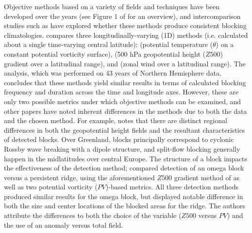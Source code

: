 \documentclass[smallextended]{svjour3}       %
\numberwithin{equation}{section}
\begin{document}
Objective methods based on a variety of fields and techniques have been developed over the years (see Figure 1 of \cite{barriopedro_application_2010} for an overview), and intercomparison studies such as \cite{barnes_methodology_2012} have explored whether these methods produce consistent blocking climatologies. \cite{barnes_methodology_2012} compares three longitudinally-varying (1D) methods (i.e. calculated about a single time-varying central latitude): \citealt{pelly_new_2003} (potential temperature ($\theta$) on a constant potential vorticity surface), \citealt{tibaldi_operational_1990} (500 hPa geopotential height ($Z500$) gradient over a latitudinal range), and \citealt{scaife_atmospheric_2010} (zonal wind over a latitudinal range).
The analysis, which was performed on 43 years of Northern Hemisphere data, concludes that these methods yield similar results in terms of calculated blocking frequency and duration across the time and longitude axes. However, these are only two possible metrics under which objective methods can be examined, and other papers have noted inherent differences in the methods due to both the data and the chosen method. For example, \cite{davini_bidimensional_2012} notes that there are distinct regional differences in both the geopotential height fields and the resultant characteristics of detected blocks. Over Greenland, blocks principally correspond to cyclonic Rossby wave breaking with a dipole structure, and split-flow blocking generally happen in the midlatitudes over central Europe. The structure of a block impacts the effectiveness of the detection method; \cite{scherrer_two-dimensional_2006} compared detection of an omega block versus a persistent ridge, using the aforementioned $Z500$ gradient method of \cite{tibaldi_operational_1990} as well as two potential vorticity ($PV$)-based metrics. All three detection methods produced similar results for the omega block, but displayed notable difference in both the size and center locations of the blocked areas for the ridge. The authors attribute the differences to both the choice of the variable ($Z500$ versus $PV$) and the use of an anomaly versus total field. 
\end{document}
